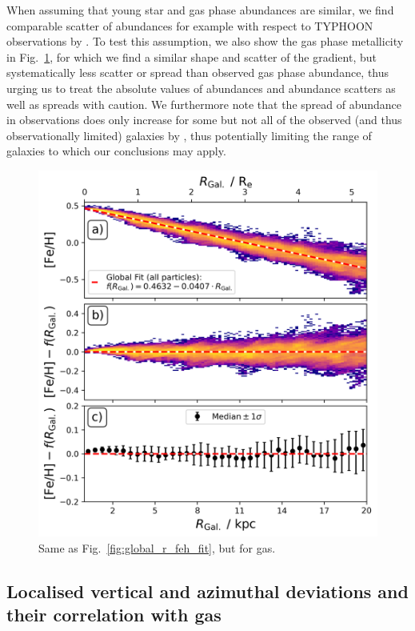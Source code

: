 \documentclass[fleqn,usenatbib]{mnras}
\begin{document}
When assuming that young star and gas phase abundances are similar, we find comparable scatter of abundances for example with respect to TYPHOON observations by \citet{Chen2023}. To test this assumption, we also show the gas phase metallicity in Fig.~\ref{fig:global_r_feh_fit_gas}, for which we find a similar shape and scatter of the gradient, but systematically less scatter or spread than observed gas phase abundance, thus urging us to treat the absolute values of abundances and abundance scatters as well as spreads with caution. We furthermore note that the spread of abundance in observations does only increase for some but not all of the observed (and thus observationally limited) galaxies by \citet{Chen2023}, thus potentially limiting the range of galaxies to which our conclusions may apply.

\begin{figure}
    \centering
    \includegraphics[width=\columnwidth]{figures/global_r_feh_fit_gas.png}
    \caption{Same as Fig.~\ref{fig:global_r_feh_fit}, but for gas.}
    \label{fig:global_r_feh_fit_gas}
\end{figure}

\subsection{Localised vertical and azimuthal deviations and their correlation with gas} \label{sec:discussion_coherence_position}
\end{document}
